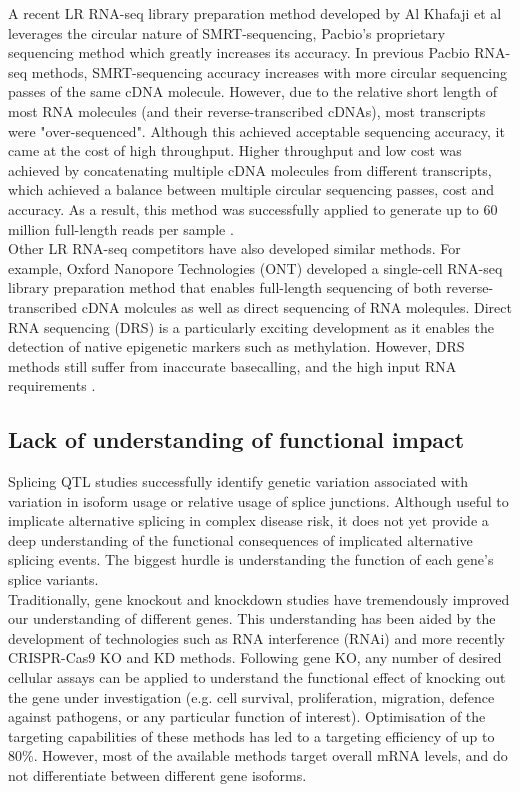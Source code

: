 A recent LR RNA-seq library preparation method developed by Al Khafaji et al leverages the circular nature of SMRT-sequencing, Pacbio's proprietary sequencing method which greatly increases its accuracy. In previous Pacbio RNA-seq methods, SMRT-sequencing accuracy increases with more circular sequencing passes of the same cDNA molecule. However, due to the relative short length of most RNA molecules (and their reverse-transcribed cDNAs), most transcripts were "over-sequenced". Although this achieved acceptable sequencing accuracy, it came at the cost of high throughput. Higher throughput and low cost was achieved by concatenating multiple cDNA molecules from different transcripts, which achieved a balance between multiple circular sequencing passes, cost and accuracy. As a result, this method was successfully applied to generate up to 60 million full-length reads per sample \cite{mas-seq-app-note,AlKhafaji2021-af}.\\

Other LR RNA-seq competitors have also developed similar methods. For example, Oxford Nanopore Technologies (ONT) developed a single-cell RNA-seq library preparation method that enables full-length sequencing of both reverse-transcribed cDNA molcules as well as direct sequencing of RNA molequles. Direct RNA sequencing (DRS) is a particularly exciting development as it enables the detection of native epigenetic markers such as methylation. However, DRS methods still suffer from inaccurate basecalling, and the high input RNA requirements \cite{Jain2022-sc}.


\subsection{Lack of understanding of functional impact}
Splicing QTL studies successfully identify genetic variation associated with variation in isoform usage or relative usage of splice junctions. Although useful to implicate alternative splicing in complex disease risk, it does not yet provide a deep understanding of the functional consequences of implicated alternative splicing events. The biggest hurdle is understanding the function of each gene's splice variants.\\

Traditionally, gene knockout and knockdown studies have tremendously improved our understanding of different genes. This understanding has been aided by the development of technologies such as RNA interference (RNAi) and more recently CRISPR-Cas9 KO and KD methods. Following gene KO, any number of desired cellular assays can be applied to understand the functional effect of knocking out the gene under investigation (e.g. cell survival, proliferation, migration, defence against pathogens, or any particular function of interest). Optimisation of the targeting capabilities of these methods has led to a targeting efficiency of up to 80\%. However, most of the available methods target overall mRNA levels, and do not differentiate between different gene isoforms.\\

